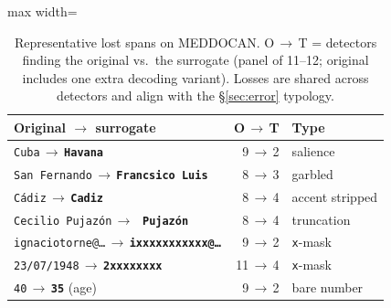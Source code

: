 \documentclass[11pt]{article}
\newcommand{\oldv}[1]{\textcolor{cclay}{#1}}
\newcommand{\newv}[1]{\textcolor{caccent}{\textbf{#1}}}
\newcommand{\arr}{\,$\rightarrow$\,\allowbreak}
\newcommand{\tp}[1]{\texttt{#1}}
\begin{document}
\begin{table}[h]\centering\small
\begin{adjustbox}{max width=\columnwidth}%
\begin{tabular}{p{3.5cm}rl}
\toprule
Original $\rightarrow$ surrogate & O\,$\rightarrow$\,T & Type\\
\midrule
\oldv{\tp{Cuba}}\arr\newv{\tp{Havana}} & 9\,$\rightarrow$\,2 & salience\\
\oldv{\tp{San Fernando}}\arr\newv{\tp{Francsico Luis}} & 8\,$\rightarrow$\,3 & garbled\\
\oldv{\tp{C\'adiz}}\arr\newv{\tp{Cadiz}} & 8\,$\rightarrow$\,4 & accent stripped\\
\oldv{\tp{Cecilio Pujaz\'on}}\arr\newv{\tp{ Pujaz\'on}} & 8\,$\rightarrow$\,4 & truncation\\
\oldv{\tp{ignaciotorne@\dots}}\arr\newv{\tp{ixxxxxxxxxxx@\dots}} & 9\,$\rightarrow$\,2 & \tp{x}-mask\\
\oldv{\tp{23/07/1948}}\arr\newv{\tp{2xxxxxxxx}} & 11\,$\rightarrow$\,4 & \tp{x}-mask\\
\oldv{\tp{40}}\arr\newv{\tp{35}} (age) & 9\,$\rightarrow$\,2 & bare number\\
\bottomrule
\end{tabular}
\end{adjustbox}
\caption{Representative lost spans on MEDDOCAN. O\,$\rightarrow$\,T = detectors finding the original vs.\ the surrogate (panel of 11--12; original includes one extra decoding variant). Losses are shared across detectors and align with the \S\ref{sec:error} typology.}\label{tab:lost}
\end{table}



\end{document}
